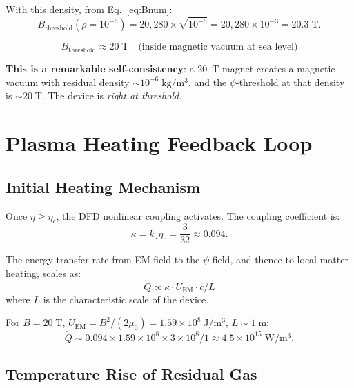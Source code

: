 \documentclass[11pt,a4paper]{article}
\begin{document}
With this density, from Eq.~\eqref{eq:Bnum}:
\begin{equation}
B_{\mathrm{threshold}}(\rho = 10^{-6}) = 20{,}280 \times \sqrt{10^{-6}}
= 20{,}280 \times 10^{-3} = 20.3\;\mathrm{T}.
\end{equation}

\begin{equation}
\boxed{B_{\mathrm{threshold}} \approx 20\;\mathrm{T} \quad
\text{(inside magnetic vacuum at sea level)}}
\end{equation}

\textbf{This is a remarkable self-consistency}: a 20~T magnet creates a magnetic
vacuum with residual density $\sim 10^{-6}\;\mathrm{kg/m^3}$, and the $\psi$-threshold
at that density is $\sim 20\;\mathrm{T}$. The device is \emph{right at threshold}.

\section{Plasma Heating Feedback Loop}\label{sec:plasma}

\subsection{Initial Heating Mechanism}

Once $\eta \geq \eta_c$, the DFD nonlinear coupling activates. The coupling
coefficient is:
\begin{equation}
\kappa = k_a \eta_c = \frac{3}{32} \approx 0.094.
\end{equation}

The energy transfer rate from EM field to the $\psi$ field, and thence to local
matter heating, scales as:
\begin{equation}
\dot{Q} \propto \kappa \cdot U_{\mathrm{EM}} \cdot c/L
\end{equation}
where $L$ is the characteristic scale of the device.

For $B = 20\;\mathrm{T}$, $U_{\mathrm{EM}} = B^2/(2\mu_0) = 1.59 \times 10^8\;\mathrm{J/m^3}$,
$L \sim 1\;\mathrm{m}$:
\begin{equation}
\dot{Q} \sim 0.094 \times 1.59 \times 10^8 \times 3 \times 10^8 / 1
\approx 4.5 \times 10^{15}\;\mathrm{W/m^3}.
\end{equation}

\subsection{Temperature Rise of Residual Gas}
\end{document}

